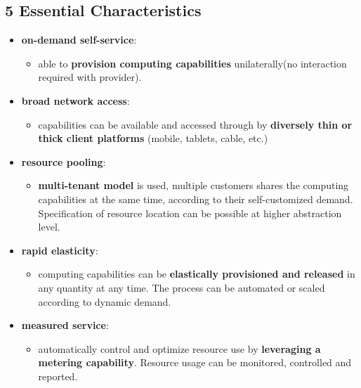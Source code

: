 \subsection{5 Essential Characteristics}
\begin{itemize}
	\item \textbf{on-demand self-service}: 
	\begin{itemize}
		\item able to \textbf{provision computing capabilities} unilaterally(no interaction required with provider).
	\end{itemize}
	
	\item \textbf{broad network access}: 
	\begin{itemize}
		\item capabilities can be available and accessed through by \textbf{diversely thin or thick client platforms} (mobile, tablets, cable, etc.)
	\end{itemize}
	
	\item \textbf{resource pooling}: 
	\begin{itemize}
		\item \textbf{multi-tenant model} is used, multiple customers shares the computing capabilities at the same time, according to their self-customized demand. Specification of resource location can be possible at higher abstraction level.
	\end{itemize}
	 
	\item \textbf{rapid elasticity}: 
	\begin{itemize}
		\item computing capabilities can be \textbf{elastically provisioned and released} in any quantity at any time. The process can be automated or scaled according to dynamic demand.
	\end{itemize}
	\item \textbf{measured service}: 
	\begin{itemize}
		\item automatically control and optimize resource use by \textbf{leveraging a metering capability}. Resource usage can be monitored, controlled and reported.
	\end{itemize}
\end{itemize}


